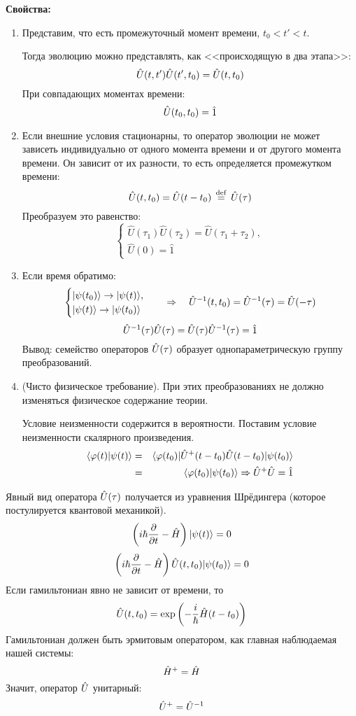 \textbf{Свойства:}
\begin{enumerate}
  \item Представим, что есть промежуточный момент времени, $t_0 < t' < t$.

  Тогда эволюцию можно представлять, как <<происходящую в два этапа>>:
  $$
    \Hat U(t, t') \Hat U(t', t_0) = \Hat U(t, t_0)
  $$
  При совпадающих моментах времени:
  $$
    \Hat U(t_0, t_0) = \hat 1
  $$
  \item Если внешние условия стационарны, то оператор эволюции не может зависеть индивидуально от одного момента времени и от другого момента времени. Он зависит от их разности, то есть определяется промежутком времени:
      $$
        \hat U(t, t_0) = \Hat U(t - t_0) \,\overset{\mathrm{def}}{=}\, \Hat U(\tau)
      $$
      Преобразуем это равенство:
      $$
      \begin{cases}
        \hat U(\tau_1) \hat U(\tau_2) = \hat U(\tau_1 + \tau_2),\\
        \hat U(0) = \hat 1
      \end{cases}
      $$
  \item Если время обратимо:
  $$
    \begin{cases}
        | \psi(t_0) \rangle \to | \psi(t) \rangle,\\
        | \psi(t) \rangle \to | \psi(t_0) \rangle
    \end{cases}
    \quad \Rightarrow \quad
    \Hat U^{-1} (t, t_0) = \hat U^{-1} (\tau) = \hat U(-\tau)
  $$
  $$
    \Hat U^{-1} (\tau) \Hat U(\tau) = \hat U(\tau) \Hat U^{-1} (\tau) = \hat 1
  $$
  Вывод: семейство операторов $\Hat U(\tau)$ образует однопараметрическую группу преобразований.
  \item (Чисто физическое требование). При этих преобразованиях не должно изменяться физическое содержание теории.

      Условие неизменности содержится в вероятности. Поставим условие неизменности скалярного произведения.
      \begin{eqnarray*}
        \langle \varphi(t) | \psi(t) \rangle &=& { \langle \varphi(t_0) |\Hat U^+ (t-t_0) \Hat U(t-t_0)| \psi(t_0) \rangle }\\
                              &=&\langle \varphi(t_0) | \psi(t_0) \rangle \Rightarrow {\Hat U}^+{\Hat U} = {\Hat 1}
      \end{eqnarray*}
\end{enumerate}%
Явный вид оператора $\Hat U(\tau)$ получается из уравнения Шрёдингера (которое постулируется квантовой механикой).
$$
    \left( i\hbar \dfrac{\partial }{\partial t} - \Hat H \right) | \psi(t) \rangle = 0
$$
$$
    \left( i \hbar \dfrac{\partial }{\partial t} - \hat H \right) \hat U (t, t_0) | \psi(t_0) \rangle = 0
$$
Если гамильтониан явно не зависит от времени, то
$$
    \hat U(t, t_0) = \exp \left( -\dfrac{i}{\hbar} \Hat H (t-t_0) \right)\index{Оператор! эволюции}
$$
Гамильтониан должен быть эрмитовым оператором, как главная наблюдаемая нашей системы:
$$
    \Hat H^+ = \hat H
$$
Значит, оператор $ \Hat U$ унитарный:
$$
    \Hat U^+ = \Hat U^{-1}
$$

